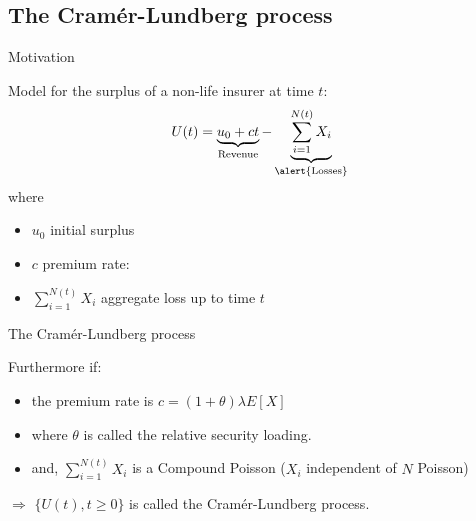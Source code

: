 \documentclass[11pt]{beamer}
\begin{document}
\subsection{ The Cram\'er-Lundberg process }
\begin{frame}{ Motivation }

Model for the surplus of a non-life insurer at time $t$:
$$U(t)=\underbrace{u_0+ct}_\text{Revenue} - \underbrace{\sum_{i=1}^{N(t)}X_i}_\text{\alert{Losses}}$$
where
\begin{itemize}
\item $u_0$ initial surplus
\item $c$ premium rate:

\item $\sum_{i=1}^{N(t)}X_i$ aggregate loss up to time $t$
\end{itemize}


\end{frame}
\begin{frame}{ The Cram\'er-Lundberg process }

Furthermore if:

\vfill

\begin{itemize}
\item the premium rate is $c=(1+\theta)\lambda E[X]$

\vfill

\item where $\theta$ is called the \alert{relative security loading}.

\vfill


\item and, $\sum_{i=1}^{N(t)}X_i$ is a Compound Poisson ($X_i$ independent of $N$ Poisson)

\end{itemize}

\vfill


$\Longrightarrow$ $\{U(t), t\geq0 \}$ is called the \alert{Cram\'er-Lundberg process}.

\end{frame}
\end{document}
